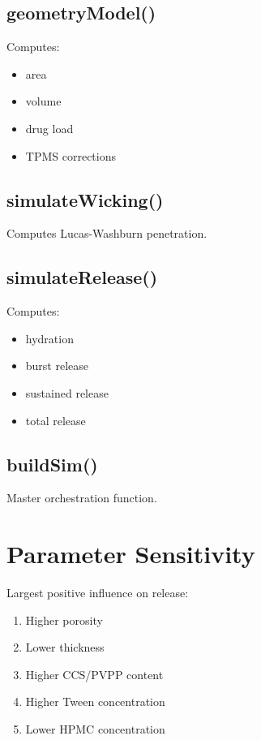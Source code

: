 \documentclass[11pt]{article}
\begin{document}
\subsection{geometryModel()}

Computes:

\begin{itemize}
\item area
\item volume
\item drug load
\item TPMS corrections
\end{itemize}

\subsection{simulateWicking()}

Computes Lucas-Washburn penetration.

\subsection{simulateRelease()}

Computes:

\begin{itemize}
\item hydration
\item burst release
\item sustained release
\item total release
\end{itemize}

\subsection{buildSim()}

Master orchestration function.

\section{Parameter Sensitivity}

Largest positive influence on release:

\begin{enumerate}
\item Higher porosity
\item Lower thickness
\item Higher CCS/PVPP content
\item Higher Tween concentration
\item Lower HPMC concentration
\end{enumerate}
\end{document}
